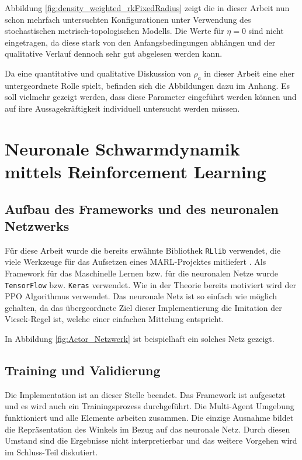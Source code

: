 \documentclass{solutionclass}
\begin{document}
Abbildung \ref{fig:density_weighted_rkFixedRadius} zeigt die in dieser Arbeit nun schon mehrfach untersuchten Konfigurationen unter Verwendung des stochastischen metrisch-topologischen Modells. Die Werte für $\eta = 0$ sind nicht eingetragen, da diese stark von den Anfangsbedingungen abhängen und der qualitative Verlauf dennoch sehr gut abgelesen werden kann.

Da eine quantitative und qualitative Diskussion von $\rho_a$ in dieser Arbeit eine eher untergeordnete Rolle spielt, befinden sich die Abbildungen dazu im Anhang. Es soll vielmehr gezeigt werden, dass diese Parameter eingeführt werden können und auf ihre Aussagekräftigkeit individuell untersucht werden müssen.

\section{Neuronale Schwarmdynamik mittels Reinforcement Learning}
\label{sec:Neuronale_Schwarmdynamik}
\subsection{Aufbau des Frameworks und des neuronalen Netzwerks}

Für diese Arbeit wurde die bereits erwähnte Bibliothek \texttt{RLlib} verwendet, die viele Werkzeuge für das Aufsetzen eines MARL-Projektes mitliefert \cite{RLlib}. Als Framework für das Maschinelle Lernen bzw. für die neuronalen Netze wurde \texttt{TensorFlow} bzw. \texttt{Keras} verwendet. Wie in der Theorie bereits motiviert wird der PPO Algorithmus verwendet. Das neuronale Netz ist so einfach wie möglich gehalten, da das übergeordnete Ziel dieser Implementierung die Imitation der Vicsek-Regel ist, welche einer einfachen Mittelung entspricht.

In Abbildung \ref{fig:Actor_Netzwerk} ist beispielhaft ein solches Netz gezeigt.

\subsection{Training und Validierung}

Die Implementation ist an dieser Stelle beendet. Das Framework ist aufgesetzt und es wird auch ein Trainingsprozess durchgeführt. Die Multi-Agent Umgebung funktioniert und alle Elemente arbeiten zusammen. Die einzige Ausnahme bildet die Repräsentation des Winkels im Bezug auf das neuronale Netz. Durch diesen Umstand sind die Ergebnisse nicht interpretierbar und das weitere Vorgehen wird im Schluss-Teil diskutiert.
\end{document}
